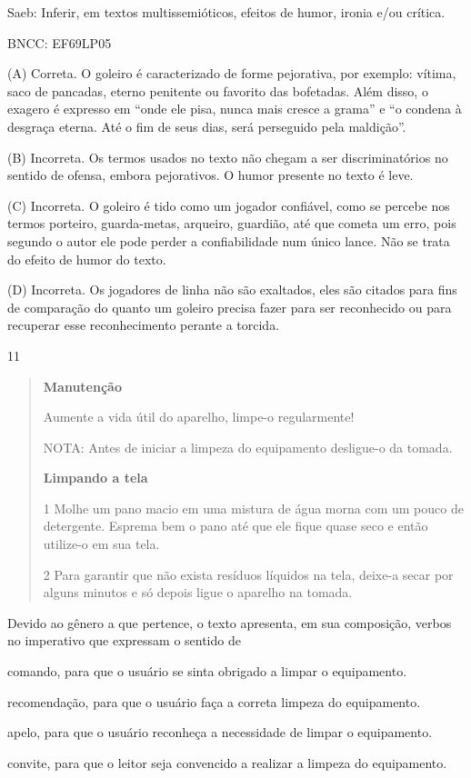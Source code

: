 Saeb: Inferir, em textos multissemióticos, efeitos de humor, ironia e/ou
crítica.

BNCC: EF69LP05

(A) Correta. O goleiro é caracterizado de forme pejorativa, por exemplo:
vítima, saco de pancadas, eterno penitente ou favorito das bofetadas.
Além disso, o exagero é expresso em ``onde ele pisa, nunca mais cresce a
grama'' e ``o condena à desgraça eterna. Até o fim de seus dias, será
perseguido pela maldição''.

(B) Incorreta. Os termos usados no texto não chegam a ser
discriminatórios no sentido de ofensa, embora pejorativos. O humor
presente no texto é leve.

(C) Incorreta. O goleiro é tido como um jogador confiável, como se
percebe nos termos porteiro, guarda-metas, arqueiro, guardião, até que
cometa um erro, pois segundo o autor ele pode perder a confiabilidade
num único lance. Não se trata do efeito de humor do texto.

(D) Incorreta. Os jogadores de linha não são exaltados, eles são citados
para fins de comparação do quanto um goleiro precisa fazer para ser
reconhecido ou para recuperar esse reconhecimento perante a torcida.

\num{11}

\begin{quote}\textbf{Manutenção}

Aumente a vida útil do aparelho, limpe-o regularmente!

NOTA: Antes de iniciar a limpeza do equipamento desligue-o da tomada.

\textbf{Limpando a tela}

\num{1} Molhe um pano macio em uma mistura de água morna com um pouco de
detergente. Esprema bem o pano até que ele fique quase seco e então
utilize-o em sua tela.

\num{2} Para garantir que não exista resíduos líquidos na tela, deixe-a
secar por alguns minutos e só depois ligue o aparelho na tomada.
\end{quote}


Devido ao gênero a que pertence, o texto apresenta, em sua composição,
verbos no imperativo que expressam o sentido de

\begin{escolha}
\item comando, para que o usuário se sinta obrigado a limpar o equipamento.

\item recomendação, para que o usuário faça a correta limpeza do
equipamento.

\item apelo, para que o usuário reconheça a necessidade de limpar o
equipamento.

\item convite, para que o leitor seja convencido a realizar a limpeza do
equipamento.
\end{escolha}

